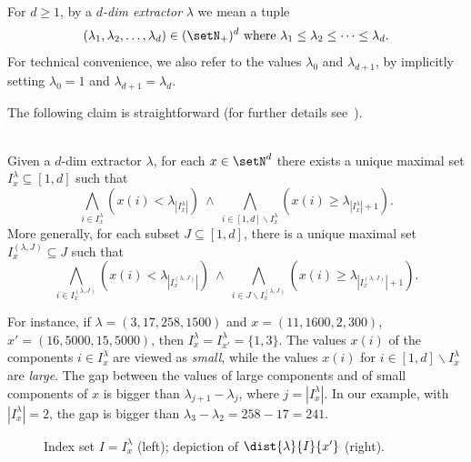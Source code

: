 \begin{defi}\label{def:extract}
\hfill\\	
For $d\geq 1$, by a \emph{$d$-dim extractor} $\lambda$
we mean a tuple 
	\[(\lambda_1,\lambda_2,\dots,\lambda_d)\in(\setN_+)^d
	\text{ where }\lambda_1\leq\lambda_2 \leq \dots \leq
	\lambda_{d}.\]
For technical convenience, we also refer to the values $\lambda_0$
	and $\lambda_{d+1}$, by
implicitly setting $\lambda_0=1$ and $\lambda_{d+1}=\lambda_d$.
\end{defi}

\noindent
The following claim is straightforward (for further details
see~\cite{DBLP:conf/fsttcs/Leroux19}).

\begin{prop}\label{prop:Ilambdax}
\hfill\\	
Given a $d$-dim extractor $\lambda$,
for each $x\in\setN^{d}$ there exists a unique maximal
	set $I_x^\lambda\subseteq [1,d]$ such that 
	\[\bigwedge_{i\in
	I^\lambda_x}\left(x(i)<\lambda_{|I^\lambda_x|}\right)\ \land\ 
	\bigwedge_{i\in[1,d]\smallsetminus
	I^\lambda_x}\left(x(i)\geq\lambda_{|I^\lambda_x|+1}\right).
	\]
	More generally, for each subset $J\subseteq [1,d]$, there is 	a unique maximal
	set $I_x^{(\lambda,J)}\subseteq J$ such that 
	\[\bigwedge_{i\in
	I^{(\lambda,J)}_x}\left(x(i)<\lambda_{|I^{(\lambda,J)}_x|}\right)\
	\land \
	\bigwedge_{i\in J\smallsetminus
	I^{(\lambda,J)}_x}\left(x(i)\geq\lambda_{|I^{(\lambda,J)}_x|+1}\right).
	\]
\end{prop}	
\noindent
For instance, if $\lambda=(3,17,258,1500)$ and $x=(11,1600,2,300)$,
$x'=(16,5000,15,5000)$, then $I^\lambda_x=I^\lambda_{x'}=\{1,3\}$.
The values $x(i)$ of the  components $i\in I^\lambda_x$ are viewed as
\emph{small}, while the values $x(i)$ for $i\in [1,d]\smallsetminus I^\lambda_x$ are
\emph{large}. The gap between the values of large components and of
small components of $x$ is bigger
than $\lambda_{j+1}-\lambda_j$, where $j=|I^\lambda_x|$.
In our example, with $|I^\lambda_x|=2$, the gap is bigger than $\lambda_3-\lambda_2=258-17=241$.
\begin{figure}[t]	
	
	\caption{Index set $I=I^\lambda_x$ (left);
	depiction of $\dist{\lambda}{I}{x'}$ (right).}\label{fig:extractor}
\end{figure}

